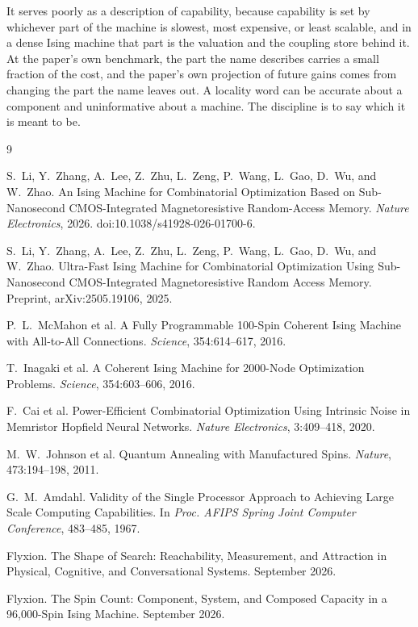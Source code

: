 \documentclass[11pt]{article}
\theoremstyle{definition}
\theoremstyle{remark}
\begin{document}
It serves poorly as a description of capability, because capability is set by whichever part of the machine is slowest, most expensive, or least scalable, and in a dense Ising machine that part is the valuation and the coupling store behind it. At the paper's own benchmark, the part the name describes carries a small fraction of the cost, and the paper's own projection of future gains comes from changing the part the name leaves out. A locality word can be accurate about a component and uninformative about a machine. The discipline is to say which it is meant to be.

\begin{thebibliography}{9}

S.~Li, Y.~Zhang, A.~Lee, Z.~Zhu, L.~Zeng, P.~Wang, L.~Gao, D.~Wu, and W.~Zhao.
An Ising Machine for Combinatorial Optimization Based on Sub-Nanosecond CMOS-Integrated Magnetoresistive Random-Access Memory.
\emph{Nature Electronics}, 2026. doi:10.1038/s41928-026-01700-6.

S.~Li, Y.~Zhang, A.~Lee, Z.~Zhu, L.~Zeng, P.~Wang, L.~Gao, D.~Wu, and W.~Zhao.
Ultra-Fast Ising Machine for Combinatorial Optimization Using Sub-Nanosecond CMOS-Integrated Magnetoresistive Random Access Memory.
Preprint, arXiv:2505.19106, 2025.

P.~L.~McMahon et al.
A Fully Programmable 100-Spin Coherent Ising Machine with All-to-All Connections.
\emph{Science}, 354:614--617, 2016.

T.~Inagaki et al.
A Coherent Ising Machine for 2000-Node Optimization Problems.
\emph{Science}, 354:603--606, 2016.

F.~Cai et al.
Power-Efficient Combinatorial Optimization Using Intrinsic Noise in Memristor Hopfield Neural Networks.
\emph{Nature Electronics}, 3:409--418, 2020.

M.~W.~Johnson et al.
Quantum Annealing with Manufactured Spins.
\emph{Nature}, 473:194--198, 2011.

G.~M.~Amdahl.
Validity of the Single Processor Approach to Achieving Large Scale Computing Capabilities.
In \emph{Proc. AFIPS Spring Joint Computer Conference}, 483--485, 1967.

Flyxion.
The Shape of Search: Reachability, Measurement, and Attraction in Physical, Cognitive, and Conversational Systems.
September 2026.

Flyxion.
The Spin Count: Component, System, and Composed Capacity in a 96,000-Spin Ising Machine.
September 2026.

\end{thebibliography}
\end{document}
